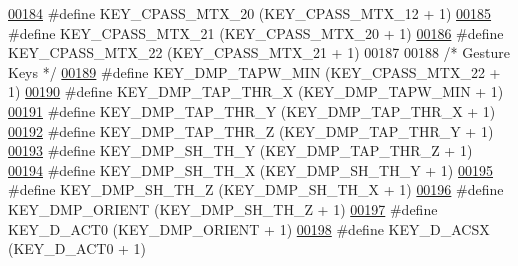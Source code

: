 \begin{DoxyCode}
\hypertarget{dmp_key_8h_source.tex_l00184}{}\hyperlink{dmp_key_8h_add9d93f2020678b2c0a1037f97fc31c9}{00184} \textcolor{preprocessor}{#define KEY\_CPASS\_MTX\_20            (KEY\_CPASS\_MTX\_12 + 1)}
\hypertarget{dmp_key_8h_source.tex_l00185}{}\hyperlink{dmp_key_8h_a9f75392213c1292ef83d3e5223500e57}{00185} \textcolor{preprocessor}{#define KEY\_CPASS\_MTX\_21            (KEY\_CPASS\_MTX\_20 + 1)}
\hypertarget{dmp_key_8h_source.tex_l00186}{}\hyperlink{dmp_key_8h_a106019b24d04189a83cbe262d0b4f881}{00186} \textcolor{preprocessor}{#define KEY\_CPASS\_MTX\_22            (KEY\_CPASS\_MTX\_21 + 1)}
00187 
00188 \textcolor{comment}{/* Gesture Keys */}
\hypertarget{dmp_key_8h_source.tex_l00189}{}\hyperlink{dmp_key_8h_afe62349990c597a5f753eef233885e9d}{00189} \textcolor{preprocessor}{#define KEY\_DMP\_TAPW\_MIN            (KEY\_CPASS\_MTX\_22 + 1)}
\hypertarget{dmp_key_8h_source.tex_l00190}{}\hyperlink{dmp_key_8h_a2fe4310934a466f948cc0a52fabf8a10}{00190} \textcolor{preprocessor}{#define KEY\_DMP\_TAP\_THR\_X           (KEY\_DMP\_TAPW\_MIN + 1)}
\hypertarget{dmp_key_8h_source.tex_l00191}{}\hyperlink{dmp_key_8h_a0c33b33024b7b91167510ee7dff3231a}{00191} \textcolor{preprocessor}{#define KEY\_DMP\_TAP\_THR\_Y           (KEY\_DMP\_TAP\_THR\_X + 1)}
\hypertarget{dmp_key_8h_source.tex_l00192}{}\hyperlink{dmp_key_8h_a79f2fd731f5be0e4ed4572f2d64de318}{00192} \textcolor{preprocessor}{#define KEY\_DMP\_TAP\_THR\_Z           (KEY\_DMP\_TAP\_THR\_Y + 1)}
\hypertarget{dmp_key_8h_source.tex_l00193}{}\hyperlink{dmp_key_8h_a4a1d4465e08051e77aec004995ff8ed2}{00193} \textcolor{preprocessor}{#define KEY\_DMP\_SH\_TH\_Y             (KEY\_DMP\_TAP\_THR\_Z + 1)}
\hypertarget{dmp_key_8h_source.tex_l00194}{}\hyperlink{dmp_key_8h_a53e640147baaac161809f81c7a13293a}{00194} \textcolor{preprocessor}{#define KEY\_DMP\_SH\_TH\_X             (KEY\_DMP\_SH\_TH\_Y + 1)}
\hypertarget{dmp_key_8h_source.tex_l00195}{}\hyperlink{dmp_key_8h_a6d3d587a63dd8db885121376f3d9de93}{00195} \textcolor{preprocessor}{#define KEY\_DMP\_SH\_TH\_Z             (KEY\_DMP\_SH\_TH\_X + 1)}
\hypertarget{dmp_key_8h_source.tex_l00196}{}\hyperlink{dmp_key_8h_ac41087ebcc3dc0d4cd083a1ee71e01d8}{00196} \textcolor{preprocessor}{#define KEY\_DMP\_ORIENT              (KEY\_DMP\_SH\_TH\_Z + 1)}
\hypertarget{dmp_key_8h_source.tex_l00197}{}\hyperlink{dmp_key_8h_ab66e05ae1513ae27ec6275cc275e6b66}{00197} \textcolor{preprocessor}{#define KEY\_D\_ACT0                  (KEY\_DMP\_ORIENT + 1)}
\hypertarget{dmp_key_8h_source.tex_l00198}{}\hyperlink{dmp_key_8h_aac3f8565178bc31cd9c1b8276c2e7b5b}{00198} \textcolor{preprocessor}{#define KEY\_D\_ACSX                  (KEY\_D\_ACT0 + 1)}

\end{DoxyCode}
